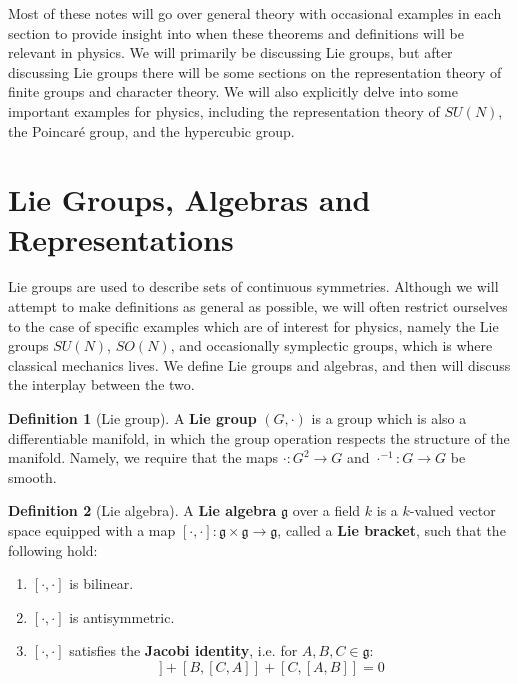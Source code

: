 \documentclass[11pt, oneside]{article}   	%
\theoremstyle{definition}
\newtheorem{definition}{Definition}[section]
\begin{document}
Most of these notes will go over general theory with occasional examples in each section to provide insight into 
when these theorems and definitions will be relevant in physics. We will primarily be discussing Lie groups, but 
after discussing Lie groups there will be some sections on the representation theory of finite groups and character 
theory. We will also explicitly delve into some important examples for physics, including the representation theory 
of $SU(N)$, the Poincar\'e group, and the hypercubic group.

\newpage
\section{Lie Groups, Algebras and Representations}

Lie groups are used to describe sets of continuous symmetries. Although we will attempt to 
make definitions as general as possible, we will often restrict ourselves to the case of specific 
examples which are of interest for physics, namely the Lie groups $SU(N)$, $SO(N)$, and 
occasionally symplectic groups, which is where classical mechanics lives. We define Lie groups 
and algebras, and then will discuss the 
interplay between the two.

\begin{definition}[Lie group]
	A \textbf{Lie group} $(G, \cdot)$ is a group which is also a differentiable manifold, in which the 
	group operation respects the structure of the manifold. Namely, we require that the maps 
	$\cdot : G^2\rightarrow G$ and $\cdot^{-1} : G\rightarrow G$ be smooth.
\end{definition}

\begin{definition}[Lie algebra]
	A \textbf{Lie algebra} $\mathfrak g$ over a field $k$ is a $k$-valued vector space equipped with 
	a map $[\cdot, \cdot] : \mathfrak g\times\mathfrak g\rightarrow\mathfrak g$, called a \textbf{Lie 
	bracket}, such that the following hold:
	\begin{enumerate}
		\item $[\cdot, \cdot]$ is bilinear.
		\item $[\cdot, \cdot]$ is antisymmetric. 
		\item $[\cdot, \cdot]$ satisfies the \textbf{Jacobi identity}, i.e. for $A, B, C\in\mathfrak g$:
		\begin{equation}
			[A, [B, C]] + [B, [C, A]] + [C, [A, B]] = 0
		\end{equation}
	\end{enumerate}
\end{definition}
\end{document}
